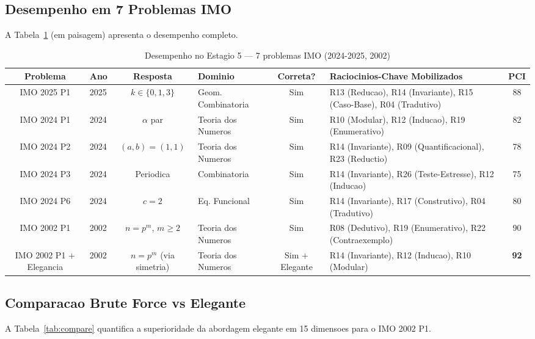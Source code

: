 \documentclass[5p]{elsarticle}
\begin{document}
\subsection{Desempenho em 7 Problemas IMO}

A Tabela~\ref{tab:imo7} (em paisagem) apresenta o desempenho completo.

\begin{landscape}
\begin{table}[H]
  \centering
  \caption{Desempenho no Estagio 5 — 7 problemas IMO (2024-2025, 2002)}
  \label{tab:imo7}
  \small
  \begin{tabular}{clcp{3.5cm}cp{4cm}c}
    \toprule
    \textbf{Problema} & \textbf{Ano} & \textbf{Resposta} & \textbf{Dominio} & \textbf{Correta?} & \textbf{Raciocinios-Chave Mobilizados} & \textbf{PCI} \\
    \midrule
    IMO 2025 P1 & 2025 & $k\in\{0,1,3\}$ & Geom. Combinatoria & Sim & R13 (Reducao), R14 (Invariante), R15 (Caso-Base), R04 (Tradutivo) & 88 \\
    IMO 2024 P1 & 2024 & $\alpha$ par & Teoria dos Numeros & Sim & R10 (Modular), R12 (Inducao), R19 (Enumerativo) & 82 \\
    IMO 2024 P2 & 2024 & $(a,b)=(1,1)$ & Teoria dos Numeros & Sim & R14 (Invariante), R09 (Quantificacional), R23 (Reductio) & 78 \\
    IMO 2024 P3 & 2024 & Periodica & Combinatoria & Sim & R14 (Invariante), R26 (Teste-Estresse), R12 (Inducao) & 75 \\
    IMO 2024 P6 & 2024 & $c=2$ & Eq. Funcional & Sim & R14 (Invariante), R17 (Construtivo), R04 (Tradutivo) & 80 \\
    IMO 2002 P1 & 2002 & $n=p^m$, $m\geq 2$ & Teoria dos Numeros & Sim & R08 (Dedutivo), R19 (Enumerativo), R22 (Contraexemplo) & 90 \\
    \rowcolor{greenbg}
    IMO 2002 P1 + Elegancia & 2002 & $n=p^m$ (via simetria) & Teoria dos Numeros & Sim + Elegante & R14 (Invariante), R12 (Inducao), R10 (Modular) & \textbf{92} \\
    \bottomrule
  \end{tabular}
\end{table}
\end{landscape}

\subsection{Comparacao Brute Force vs Elegante}

A Tabela~\ref{tab:compare} quantifica a superioridade da abordagem elegante
em 15 dimensoes para o IMO 2002 P1.
\end{document}
